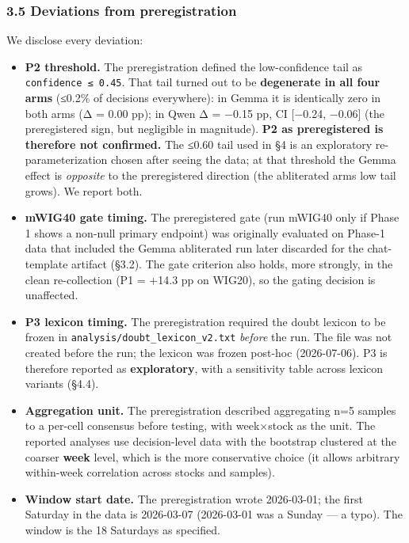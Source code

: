 \documentclass[
  10pt,
]{article}
\providecommand{\tightlist}{%
  \setlength{\itemsep}{0pt}\setlength{\parskip}{0pt}}
\begin{document}
\subsubsection{3.5 Deviations from
preregistration}\label{35-deviations-from-preregistration}

We disclose every deviation:

\begin{itemize}
\tightlist
\item
  \textbf{P2 threshold.} The preregistration defined the low-confidence
  tail as \texttt{confidence\ ≤\ 0.45}. That tail turned out to be
  \textbf{degenerate in all four arms} (≤0.2\% of decisions everywhere):
  in Gemma it is identically zero in both arms (Δ = 0.00 pp); in Qwen Δ
  = −0.15 pp, CI {[}−0.24, −0.06{]} (the preregistered sign, but
  negligible in magnitude). \textbf{P2 as preregistered is therefore not
  confirmed.} The ≤0.60 tail used in §4 is an exploratory
  re-parameterization chosen after seeing the data; at that threshold
  the Gemma effect is \emph{opposite} to the preregistered direction
  (the abliterated arm\textquotesingle s low tail grows). We report
  both.
\item
  \textbf{mWIG40 gate timing.} The preregistered gate (run mWIG40 only
  if Phase 1 shows a non-null primary endpoint) was originally evaluated
  on Phase-1 data that included the Gemma abliterated run later
  discarded for the chat-template artifact (§3.2). The gate criterion
  also holds, more strongly, in the clean re-collection (P1 = +14.3 pp
  on WIG20), so the gating decision is unaffected.
\item
  \textbf{P3 lexicon timing.} The preregistration required the doubt
  lexicon to be frozen in \texttt{analysis/}\allowbreak\texttt{doubt\_lexicon\_v2.txt}
  \emph{before} the run. The file was not created before the run; the
  lexicon was frozen post-hoc (2026-07-06). P3 is therefore reported as
  \textbf{exploratory}, with a sensitivity table across lexicon variants
  (§4.4).
\item
  \textbf{Aggregation unit.} The preregistration described aggregating
  n=5 samples to a per-cell consensus before testing, with week×stock as
  the unit. The reported analyses use decision-level data with the
  bootstrap clustered at the coarser \textbf{week} level, which is the
  more conservative choice (it allows arbitrary within-week correlation
  across stocks and samples).
\item
  \textbf{Window start date.} The preregistration wrote 2026-03-01; the
  first Saturday in the data is 2026-03-07 (2026-03-01 was a Sunday ---
  a typo). The window is the 18 Saturdays as specified.
\end{itemize}
\end{document}
